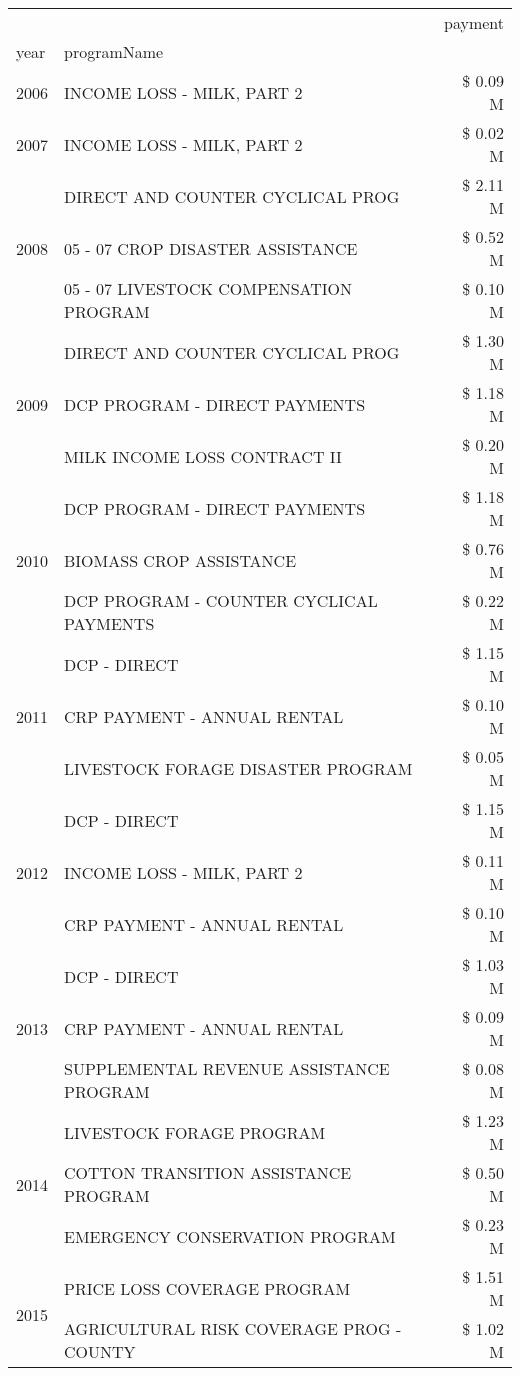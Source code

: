 \begin{tabular}{llr}
\toprule
 &  & payment \\
year & programName &  \\
\midrule
2006 & INCOME LOSS - MILK, PART 2 & \$ 0.09 M \\
\cline{1-3}
2007 & INCOME LOSS - MILK, PART 2 & \$ 0.02 M \\
\cline{1-3}
\multirow[t]{3}{*}{2008} & DIRECT AND COUNTER CYCLICAL PROG & \$ 2.11 M \\
 & 05 - 07 CROP DISASTER ASSISTANCE & \$ 0.52 M \\
 & 05 - 07 LIVESTOCK COMPENSATION PROGRAM & \$ 0.10 M \\
\cline{1-3}
\multirow[t]{3}{*}{2009} & DIRECT AND COUNTER CYCLICAL PROG & \$ 1.30 M \\
 & DCP PROGRAM - DIRECT PAYMENTS & \$ 1.18 M \\
 & MILK INCOME LOSS CONTRACT II & \$ 0.20 M \\
\cline{1-3}
\multirow[t]{3}{*}{2010} & DCP PROGRAM - DIRECT PAYMENTS & \$ 1.18 M \\
 & BIOMASS CROP ASSISTANCE & \$ 0.76 M \\
 & DCP PROGRAM - COUNTER CYCLICAL PAYMENTS & \$ 0.22 M \\
\cline{1-3}
\multirow[t]{3}{*}{2011} & DCP - DIRECT & \$ 1.15 M \\
 & CRP PAYMENT - ANNUAL RENTAL & \$ 0.10 M \\
 & LIVESTOCK FORAGE DISASTER PROGRAM & \$ 0.05 M \\
\cline{1-3}
\multirow[t]{3}{*}{2012} & DCP - DIRECT & \$ 1.15 M \\
 & INCOME LOSS - MILK, PART 2 & \$ 0.11 M \\
 & CRP PAYMENT - ANNUAL RENTAL & \$ 0.10 M \\
\cline{1-3}
\multirow[t]{3}{*}{2013} & DCP - DIRECT & \$ 1.03 M \\
 & CRP PAYMENT - ANNUAL RENTAL & \$ 0.09 M \\
 & SUPPLEMENTAL REVENUE ASSISTANCE PROGRAM & \$ 0.08 M \\
\cline{1-3}
\multirow[t]{3}{*}{2014} & LIVESTOCK FORAGE PROGRAM & \$ 1.23 M \\
 & COTTON TRANSITION ASSISTANCE PROGRAM & \$ 0.50 M \\
 & EMERGENCY CONSERVATION PROGRAM & \$ 0.23 M \\
\cline{1-3}
\multirow[t]{3}{*}{2015} & PRICE LOSS COVERAGE PROGRAM & \$ 1.51 M \\
 & AGRICULTURAL RISK COVERAGE PROG - COUNTY & \$ 1.02 M \\

\end{tabular}
